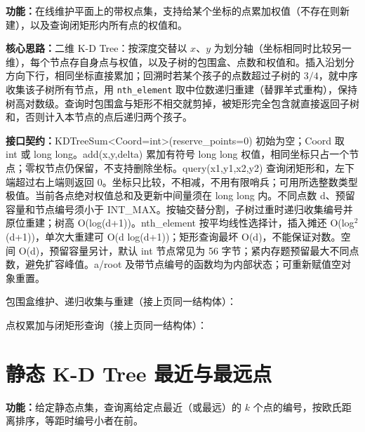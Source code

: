 \noindent\textbf{功能：}\allowbreak 在线维护平面上的带权点集，支持给某个坐标的点累加权值（不存在则新建），以及查询闭矩形内所有点的权值和。

\textbf{核心思路：}\allowbreak 二维 K-D Tree：按深度交替以 $x$、$y$ 为划分轴（坐标相同时比较另一维），每个节点存自身点与权值，以及子树的包围盒、点数和权值和。插入沿划分方向下行，相同坐标直接累加；回溯时若某个孩子的点数超过子树的 $3/4$，就中序收集该子树所有节点，用 \texttt{nth\_element} 取中位数递归重建（替罪羊式重构），保持树高对数级。查询时包围盒与矩形不相交就剪掉，被矩形完全包含就直接返回子树和，否则计入本节点的点后递归两个孩子。



{\sloppy{}\noindent\textbf{接口契约：}KDTreeSum<Coord=int>(reserve\_points=0) 初始为空；Coord 取 int 或 long long。add(x,y,delta) 累加有符号 long long 权值，相同坐标只占一个节点；零权节点仍保留，不支持删除坐标。query(x1,y1,x2,y2) 查询闭矩形和，左下端超过右上端则返回 0。坐标只比较，不相减，不用有限哨兵；可用所选整数类型极值。当前各点绝对权值总和及更新中间量须在 long long 内。不同点数 d、预留容量和节点编号须小于 INT\_MAX。按轴交替分割，子树过重时递归收集编号并原位重建；树高 O(log(d+1))。nth\_element 按平均线性选择计，插入摊还 O(log$^{2}$(d+1))，单次大重建可 O(d log(d+1))；矩形查询最坏 O(d)，不能保证对数。空间 O(d)，预留容量另计，默认 int 节点常见为 56 字节；紧内存题预留最大不同点数，避免扩容峰值。a/root 及带节点编号的函数均为内部状态；可重新赋值空对象重置。\par}

\Needspace{413pt}



\newpage

\noindent 包围盒维护、递归收集与重建（接上页同一结构体）：



\newpage

\noindent 点权累加与闭矩形查询（接上页同一结构体）：



\section{静态 K-D Tree 最近与最远点}\label{compact-KDNearest}

\noindent\textbf{功能：}\allowbreak 给定静态点集，查询离给定点最近（或最远）的 $k$ 个点的编号，按欧氏距离排序，等距时编号小者在前。


